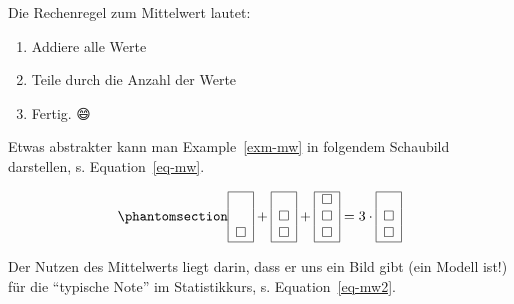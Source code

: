 \documentclass[
  letterpaper,
  DIV=11,
  numbers=noendperiod]{scrartcl}
\providecommand{\tightlist}{%
  \setlength{\itemsep}{0pt}\setlength{\parskip}{0pt}}\usepackage{longtable,booktabs,array}
\theoremstyle{definition}
\theoremstyle{definition}
\theoremstyle{definition}
\theoremstyle{remark}
\begin{document}
Die Rechenregel zum Mittelwert lautet:

\begin{enumerate}
\def\labelenumi{\arabic{enumi}.}
\tightlist
\item
  Addiere alle Werte
\item
  Teile durch die Anzahl der Werte
\item
  Fertig. 😄
\end{enumerate}

Etwas abstrakter kann man Example~\ref{exm-mw} in folgendem Schaubild
darstellen, s. Equation~\ref{eq-mw}.

\begin{equation}\phantomsection\label{eq-mw}{
\begin{array}{|c|} \hline \\ \\ \square \\ \hline \end{array} + \begin{array}{|c|} \hline \\ \square \\ \square \\ \hline \end{array} + \begin{array}{|c|} \hline \square \\ \square \\ \square \\ \hline \end{array} = 3 \cdot \begin{array}{|c|} \hline \\ \square \\ \square \\ \hline \end{array}
}\end{equation}

Der Nutzen des Mittelwerts liegt darin, dass er uns ein Bild gibt (ein
Modell ist!) für die ``typische Note'' im Statistikkurs, s.
Equation~\ref{eq-mw2}.
\end{document}
